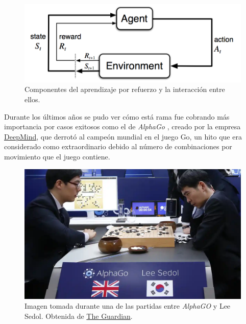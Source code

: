\begin{figure}[ht!]
  \centering
  \includegraphics[width=1\textwidth]{figuras/RL_diagram.png}
  \caption[Componentes del aprendizaje por refuerzo y la interacción entre ellos.]{Componentes del aprendizaje por refuerzo y la interacción entre ellos.}
  \label{fig-reinforcement-learning-components}
\end{figure}

Durante los últimos años se pudo ver cómo está rama fue cobrando más importancia por casos exitosos como el de \textit{AlphaGo} \citep{silver2016mastering}, creado por la empresa \href{deepmind.com}{DeepMind}, que derrotó al campeón mundial en el juego Go, un hito que era considerado como extraordinario debido al número de combinaciones por movimiento que el juego contiene.
\medskip

\begin{figure}[ht!]
  \centering
  \includegraphics[width=1\textwidth]{figuras/alphago.png}
  \caption[Imagen tomada durante una de las partidas entre \textit{AlphaGO} y Lee Sedol.]{Imagen tomada durante una de las partidas entre \textit{AlphaGO} y Lee Sedol. Obtenida de \href{https://www.theguardian.com/technology/2016/mar/15/alphago-what-does-google-advanced-software-go-next}{The Guardian}.}
  \label{fig-alphago}
\end{figure}

